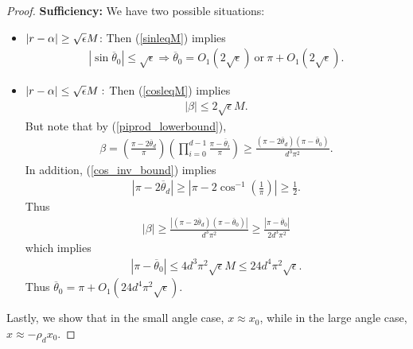\documentclass{article}
\begin{document}
\begin{proof}
\textbf{Sufficiency:} We have two possible situations:
\begin{itemize}
\item $|r - \alpha| \geq \sqrt{\epsilon}M$: Then (\ref{sinleqM}) implies \begin{align*}
|\sin \overline{\theta}_0| \leq \sqrt{\epsilon} \Longrightarrow \overline{\theta}_0 = O_1(2\sqrt{\epsilon})\ \text{or}\ \pi + O_1(2\sqrt{\epsilon}).
\end{align*}
\item $|r - \alpha| \leq \sqrt{\epsilon}M:$ Then (\ref{cosleqM}) implies \begin{align*}
|\beta| \leq 2 \sqrt{\epsilon}M.
\end{align*} But note that by (\ref{piprod_lowerbound}), \begin{align*}
\beta = \left(\frac{\pi - 2\overline{\theta}_d}{\pi}\right)\left(\prod_{i=0}^{d-1}\frac{\pi - \overline{\theta}_i}{\pi}\right) \geq \frac{(\pi - 2 \overline{\theta}_d)(\pi - \overline{\theta}_0)}{d^3\pi^2}.
\end{align*} In addition, (\ref{cos_inv_bound}) implies \begin{align*}
|\pi - 2\overline{\theta}_d| \geq \left|\pi - 2\cos^{-1}\left(\frac{1}{\pi}\right)\right|  \geq \frac{1}{2}.
\end{align*} Thus \begin{align*}
|\beta| \geq \frac{|(\pi - 2\overline{\theta}_d)(\pi - \overline{\theta}_0)|}{d^3 \pi^2} \geq \frac{|\pi - \overline{\theta}_0|}{2d^3\pi^2}
\end{align*} which implies \begin{align*}
|\pi - \overline{\theta}_0| \leq 4d^3\pi^2\sqrt{\epsilon}M \leq 24d^4\pi^2 \sqrt{\epsilon}.
\end{align*} Thus $\overline{\theta}_0 = \pi + O_1(24d^4\pi^2 \sqrt{\epsilon})$.
\end{itemize}

Lastly, we show that in the small angle case, $x \approx x_0$, while in the large angle case, $x \approx -\rho_d x_0$.


\end{proof}
\end{document}
